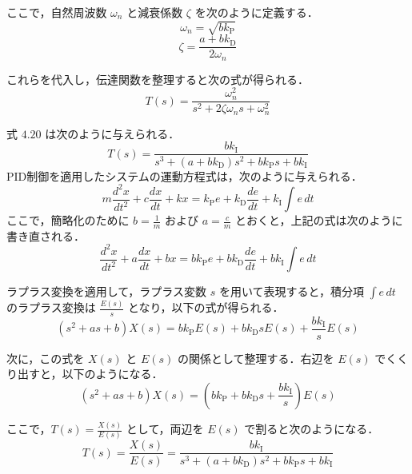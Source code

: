 ここで，自然周波数 \( \omega_n \) と減衰係数 \( \zeta \) を次のように定義する．
\[
  \omega_n = \sqrt{b k_{\mathrm{P}}}
\]
\[
  \zeta = \frac{a + b k_{\mathrm{D}}}{2 \omega_n}
\]

これらを代入し，伝達関数を整理すると次の式が得られる．
\[
  T(s) = \frac{\omega_n^2}{s^2 + 2 \zeta \omega_n s + \omega_n^2}
\]


式 \(4.20\) は次のように与えられる．
\[
  T(s) = \frac{b k_{\mathrm{I}}}{s^3 + (a + b k_{\mathrm{D}})s^2 + b k_{\mathrm{P}} s + b k_{\mathrm{I}}}
\]
PID制御を適用したシステムの運動方程式は，次のように与えられる．
\[
  m \frac{d^2 x}{dt^2} + c \frac{dx}{dt} + kx = k_{\mathrm{P}} e + k_{\mathrm{D}} \frac{de}{dt} + k_{\mathrm{I}} \int e \, dt
\]
ここで，簡略化のために \( b = \frac{1}{m} \) および \( a = \frac{c}{m} \) とおくと，上記の式は次のように書き直される．
\[
  \frac{d^2 x}{dt^2} + a \frac{dx}{dt} + bx = b k_{\mathrm{P}} e + b k_{\mathrm{D}} \frac{de}{dt} + b k_{\mathrm{I}} \int e \, dt
\]

ラプラス変換を適用して，ラプラス変数 \( s \) を用いて表現すると，積分項 \( \int e \, dt \) のラプラス変換は \( \frac{E(s)}{s} \) となり，以下の式が得られる．
\[
  (s^2 + as + b) X(s) = b k_{\mathrm{P}} E(s) + b k_{\mathrm{D}} s E(s) + \frac{b k_{\mathrm{I}}}{s} E(s)
\]

次に，この式を \( X(s) \) と \( E(s) \) の関係として整理する．右辺を \( E(s) \) でくくり出すと，以下のようになる．
\[
  (s^2 + as + b) X(s) = \left( b k_{\mathrm{P}} + b k_{\mathrm{D}} s + \frac{b k_{\mathrm{I}}}{s} \right) E(s)
\]

ここで，\( T(s) = \frac{X(s)}{E(s)} \) として，両辺を \( E(s) \) で割ると次のようになる．
\[
  T(s) = \frac{X(s)}{E(s)} = \frac{b k_{\mathrm{I}}}{s^3 + (a + b k_{\mathrm{D}}) s^2 + b k_{\mathrm{P}} s + b k_{\mathrm{I}}}
\]